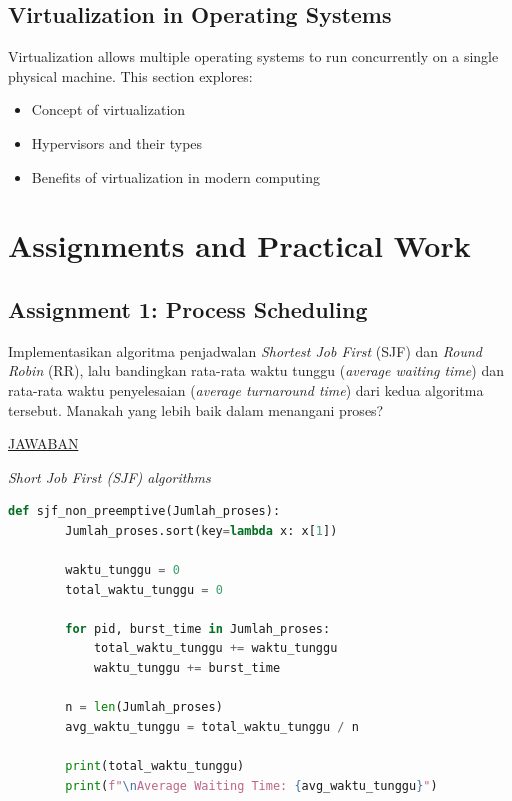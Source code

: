 \documentclass[12pt]{article}
\begin{document}
\subsection{Virtualization in Operating Systems}
Virtualization allows multiple operating systems to run concurrently on a single physical machine. This section explores:
\begin{itemize}
    \item Concept of virtualization
    \item Hypervisors and their types
    \item Benefits of virtualization in modern computing
\end{itemize}


\section{Assignments and Practical Work}
\subsection{Assignment 1: Process Scheduling}
\hspace*{1cm} Implementasikan algoritma penjadwalan \textit{Shortest Job First} (SJF) dan \textit{Round Robin} (RR), lalu bandingkan rata-rata waktu tunggu (\textit{average waiting time}) dan rata-rata waktu penyelesaian (\textit{average turnaround time}) dari kedua algoritma tersebut. Manakah yang lebih baik dalam menangani proses? 
\newline
\newline

\begin{center}
    \underline{JAWABAN}
\end{center}

\textit{Short Job First (SJF) algorithms}
\begin{lstlisting}[language=Python]
    def sjf_non_preemptive(Jumlah_proses):
        Jumlah_proses.sort(key=lambda x: x[1])
    
        waktu_tunggu = 0
        total_waktu_tunggu = 0
    
        for pid, burst_time in Jumlah_proses:
            total_waktu_tunggu += waktu_tunggu
            waktu_tunggu += burst_time
    
        n = len(Jumlah_proses)
        avg_waktu_tunggu = total_waktu_tunggu / n
    
        print(total_waktu_tunggu)
        print(f"\nAverage Waiting Time: {avg_waktu_tunggu}")    
    
\end{lstlisting}
\end{document}

